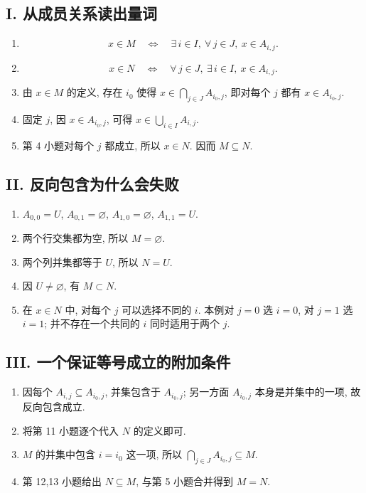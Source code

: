 \documentclass[usesamecnt, thmcnt=section, lang=cn, newtx, 10pt, scheme=chinese]{elegantbook}
\begin{document}
\subsection*{I. 从成员关系读出量词}
\begin{enumerate}[label=\textbf{\arabic*.}]
  \item
  \[
   x\in M
   \quad\Leftrightarrow\quad
   \exists\,i\in I,\ \forall\,j\in J,\ x\in A_{i,j}.
  \]
  \item
  \[
   x\in N
   \quad\Leftrightarrow\quad
   \forall\,j\in J,\ \exists\,i\in I,\ x\in A_{i,j}.
  \]
  \item 由 $x\in M$ 的定义, 存在 $i_0$ 使得 $x\in\bigcap_{j\in J}A_{i_0,j}$, 即对每个 $j$ 都有 $x\in A_{i_0,j}$.
  \item 固定 $j$, 因 $x\in A_{i_0,j}$, 可得 $x\in\bigcup_{i\in I}A_{i,j}$.
  \item 第 4 小题对每个 $j$ 都成立, 所以 $x\in N$. 因而 $M\subseteq N$.
\end{enumerate}

\subsection*{II. 反向包含为什么会失败}
\begin{enumerate}[label=\textbf{\arabic*.}, start=6]
  \item $A_{0,0}=U$, $A_{0,1}=\varnothing$, $A_{1,0}=\varnothing$, $A_{1,1}=U$.
  \item 两个行交集都为空, 所以 $M=\varnothing$.
  \item 两个列并集都等于 $U$, 所以 $N=U$.
  \item 因 $U\neq\varnothing$, 有 $M\subset N$.
  \item 在 $x\in N$ 中, 对每个 $j$ 可以选择不同的 $i$. 本例对 $j=0$ 选 $i=0$, 对 $j=1$ 选 $i=1$; 并不存在一个共同的 $i$ 同时适用于两个 $j$.
\end{enumerate}

\subsection*{III. 一个保证等号成立的附加条件}
\begin{enumerate}[label=\textbf{\arabic*.}, start=11]
  \item 因每个 $A_{i,j}\subseteq A_{i_0,j}$, 并集包含于 $A_{i_0,j}$; 另一方面 $A_{i_0,j}$ 本身是并集中的一项, 故反向包含成立.
  \item 将第 11 小题逐个代入 $N$ 的定义即可.
  \item $M$ 的并集中包含 $i=i_0$ 这一项, 所以 $\bigcap_{j\in J}A_{i_0,j}\subseteq M$.
  \item 第 12,13 小题给出 $N\subseteq M$, 与第 5 小题合并得到 $M=N$.
\end{enumerate}
\end{document}

